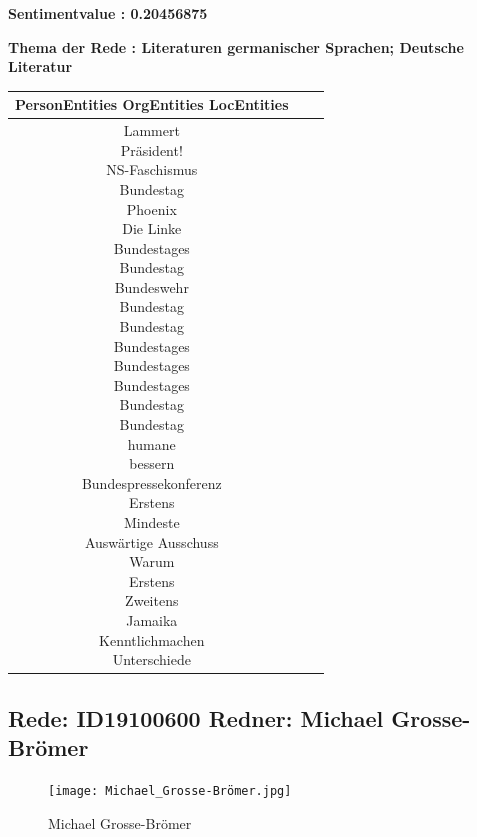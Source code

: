 \documentclass[a4paper,11pt]{article}
\begin{document}
\textbf{Sentimentvalue : 0.20456875}

\textbf{Thema der Rede : Literaturen germanischer Sprachen; Deutsche Literatur}
\vspace*{1cm}

\begin{table}[ht]
\centering
\begin{tabular}{||c | c | c||}
\hline
PersonEntities  OrgEntities  LocEntities \\ 

\hline\hline
\makecell{Lammert \\
} 
\makecell{Präsident! \\
NS-Faschismus \\
Bundestag \\
Phoenix \\
Die Linke \\
Bundestages \\
Bundestag \\
Bundeswehr \\
Bundestag \\
Bundestag \\
Bundestages \\
Bundestages \\
Bundestages \\
Bundestag \\
Bundestag \\
} 
\makecell{humane \\
bessern \\
Bundespressekonferenz \\
Erstens \\
Mindeste \\
Auswärtige Ausschuss \\
Warum \\
Erstens \\
Zweitens \\
Jamaika \\
Kenntlichmachen \\
Unterschiede \\
}\\
\hline
\end{tabular}
\end{table}
\clearpage


\subsection{Rede: ID19100600  Redner: Michael Grosse-Brömer}

\begin{figure}[ht]

\centering

\texttt{[image: Michael\_Grosse-Brömer.jpg]}

\caption{Michael Grosse-Brömer}

\end{figure}
\end{document}
